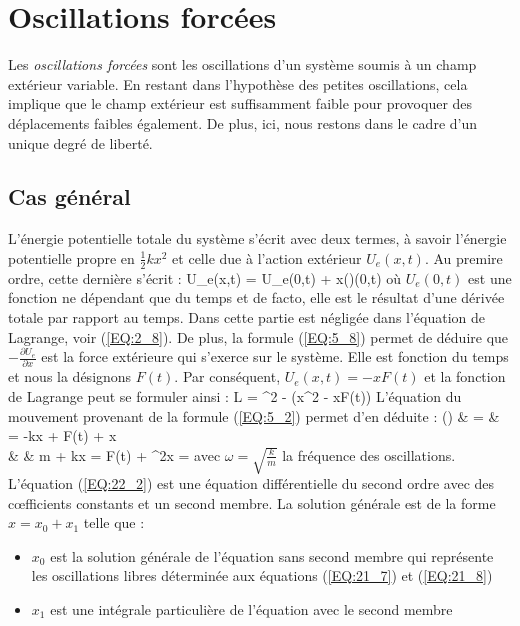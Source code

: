 \section{Oscillations forc\'ees}\label{PAR:22}

Les \emph{oscillations forc\'ees} sont les oscillations d'un syst\`eme soumis \`a un champ ext\'erieur variable. En restant dans l'hypoth\`ese des petites oscillations, cela implique que le champ ext\'erieur est suffisamment faible pour provoquer des d\'eplacements faibles \'egalement. De plus, ici, nous restons dans le cadre d'un unique degr\'e de libert\'e.

\subsection{Cas g\'en\'eral}

L'\'energie potentielle totale du syst\`eme s'\'ecrit avec deux termes, \`a savoir l'\'energie potentielle propre en $\frac{1}{2}kx^{2}$ et celle due \`a l'action ext\'erieur $U_{e}(x,t)$. Au premire ordre, cette derni\`ere s'\'ecrit :
\benn
	U_{e}(x,t) = U_{e}(0,t) + x\left(\right)(0,t)
\eenn
o\`u $U_{e}(0,t)$ est une fonction ne d\'ependant que du temps et de facto, elle est le r\'esultat d'une d\'eriv\'ee totale par rapport au temps. Dans cette partie est n\'eglig\'ee dans l'\'equation de Lagrange, voir (\ref{EQ:2_8}). De plus, la formule (\ref{EQ:5_8}) permet de d\'eduire que $-\frac{\partial U_{e}}{\partial x}$ est la force ext\'erieure qui s'exerce sur le syst\`eme. Elle est fonction du temps et nous la d\'esignons $F(t)$. Par cons\'equent, $U_{e}(x,t) = -xF(t)$ et la fonction de Lagrange peut se formuler ainsi :
\be
	L = ^{2} - \left(x^{2} - xF(t)\right) \label{EQ:22_1}
\ee
L'\'equation du mouvement provenant de la formule (\ref{EQ:5_2}) permet d'en d\'eduite :
\bea
	\left(\right) & = &  \Leftrightarrow {} = -kx + F(t) + x \nonumber \\
	& \Leftrightarrow & m + kx = F(t) \Leftrightarrow {} + \omega^{2}x =  \label{EQ:22_2}
\eea
avec $\omega = \sqrt{\frac{k}{m}}$ la fr\'equence des oscillations. L'\'equation (\ref{EQ:22_2}) est une \'equation diff\'erentielle du second ordre avec des c{\oe}fficients constants et un second membre. La solution g\'en\'erale est de la forme $x = x_{0} + x_{1}$ telle que :
\begin{itemize}
	\item $x_{0}$ est la solution g\'en\'erale de l'\'equation sans second membre qui repr\'esente les oscillations libres d\'etermin\'ee aux \'equations (\ref{EQ:21_7}) et (\ref{EQ:21_8})
	\item $x_{1}$ est une int\'egrale particuli\`ere de l'\'equation avec le second membre
\end{itemize}

